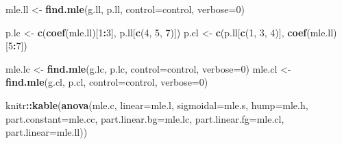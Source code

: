 \documentclass[
]{book}
\newenvironment{Shaded}{\begin{snugshade}}{\end{snugshade}}
\newcommand{\DataTypeTok}[1]{\textcolor[rgb]{0.13,0.29,0.53}{#1}}
\newcommand{\DecValTok}[1]{\textcolor[rgb]{0.00,0.00,0.81}{#1}}
\newcommand{\KeywordTok}[1]{\textcolor[rgb]{0.13,0.29,0.53}{\textbf{#1}}}
\newcommand{\NormalTok}[1]{#1}
\newcommand{\OperatorTok}[1]{\textcolor[rgb]{0.81,0.36,0.00}{\textbf{#1}}}
\newcommand{\StringTok}[1]{\textcolor[rgb]{0.31,0.60,0.02}{#1}}
\begin{document}
\begin{Shaded}
\begin{Highlighting}[]
\NormalTok{mle.ll \textless{}{-}}\StringTok{ }\KeywordTok{find.mle}\NormalTok{(g.ll, p.ll, }\DataTypeTok{control=}\NormalTok{control, }\DataTypeTok{verbose=}\DecValTok{0}\NormalTok{)}
\end{Highlighting}
\end{Shaded}

\begin{Shaded}
\begin{Highlighting}[]
\NormalTok{p.lc \textless{}{-}}\StringTok{ }\KeywordTok{c}\NormalTok{(}\KeywordTok{coef}\NormalTok{(mle.ll)[}\DecValTok{1}\OperatorTok{:}\DecValTok{3}\NormalTok{], p.ll[}\KeywordTok{c}\NormalTok{(}\DecValTok{4}\NormalTok{, }\DecValTok{5}\NormalTok{, }\DecValTok{7}\NormalTok{)])}
\NormalTok{p.cl \textless{}{-}}\StringTok{ }\KeywordTok{c}\NormalTok{(p.ll[}\KeywordTok{c}\NormalTok{(}\DecValTok{1}\NormalTok{, }\DecValTok{3}\NormalTok{, }\DecValTok{4}\NormalTok{)], }\KeywordTok{coef}\NormalTok{(mle.ll)[}\DecValTok{5}\OperatorTok{:}\DecValTok{7}\NormalTok{])}
\end{Highlighting}
\end{Shaded}

\begin{Shaded}
\begin{Highlighting}[]
\NormalTok{mle.lc \textless{}{-}}\StringTok{ }\KeywordTok{find.mle}\NormalTok{(g.lc, p.lc, }\DataTypeTok{control=}\NormalTok{control, }\DataTypeTok{verbose=}\DecValTok{0}\NormalTok{)}
\NormalTok{mle.cl \textless{}{-}}\StringTok{ }\KeywordTok{find.mle}\NormalTok{(g.cl, p.cl, }\DataTypeTok{control=}\NormalTok{control, }\DataTypeTok{verbose=}\DecValTok{0}\NormalTok{)}
\end{Highlighting}
\end{Shaded}

\begin{Shaded}
\begin{Highlighting}[]
\NormalTok{knitr}\OperatorTok{::}\KeywordTok{kable}\NormalTok{(}\KeywordTok{anova}\NormalTok{(mle.c, }\DataTypeTok{linear=}\NormalTok{mle.l, }\DataTypeTok{sigmoidal=}\NormalTok{mle.s, }\DataTypeTok{hump=}\NormalTok{mle.h, }
      \DataTypeTok{part.constant=}\NormalTok{mle.cc, }\DataTypeTok{part.linear.bg=}\NormalTok{mle.lc, }
      \DataTypeTok{part.linear.fg=}\NormalTok{mle.cl, }\DataTypeTok{part.linear=}\NormalTok{mle.ll))}
\end{Highlighting}
\end{Shaded}
\end{document}
